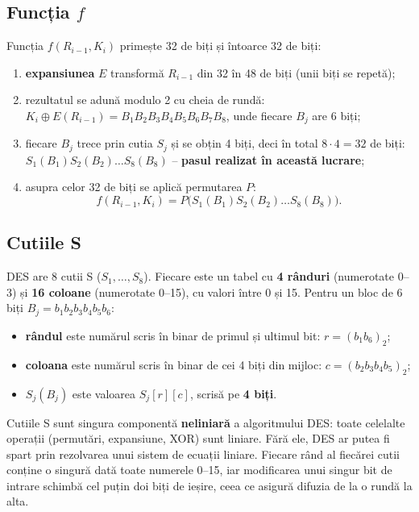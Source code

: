 \documentclass[12pt,a4paper]{article}
\begin{document}
\subsection{Funcția $f$}

Funcția $f(R_{i-1}, K_i)$ primește 32 de biți și întoarce 32 de biți:
\begin{enumerate}
    \item \textbf{expansiunea} $E$ transformă $R_{i-1}$ din 32 în 48 de biți (unii
    biți se repetă);
    \item rezultatul se adună modulo 2 cu cheia de rundă:
    $K_i \oplus E(R_{i-1}) = B_1B_2B_3B_4B_5B_6B_7B_8$, unde fiecare $B_j$ are
    6 biți;
    \item fiecare $B_j$ trece prin cutia $S_j$ și se obțin 4 biți, deci în total
    $8 \cdot 4 = 32$ de biți: $S_1(B_1)S_2(B_2)\dots S_8(B_8)$ -- \textbf{pasul
    realizat în această lucrare};
    \item asupra celor 32 de biți se aplică permutarea $P$:
    \[
        f(R_{i-1}, K_i) = P\bigl(S_1(B_1)S_2(B_2)\dots S_8(B_8)\bigr).
    \]
\end{enumerate}

\subsection{Cutiile S}

DES are 8 cutii S ($S_1, \dots, S_8$). Fiecare este un tabel cu \textbf{4 rânduri}
(numerotate 0--3) și \textbf{16 coloane} (numerotate 0--15), cu valori între 0 și
15. Pentru un bloc de 6 biți $B_j = b_1b_2b_3b_4b_5b_6$:
\begin{itemize}
    \item \textbf{rândul} este numărul scris în binar de primul și ultimul bit:
    $r = (b_1b_6)_2$;
    \item \textbf{coloana} este numărul scris în binar de cei 4 biți din mijloc:
    $c = (b_2b_3b_4b_5)_2$;
    \item $S_j(B_j)$ este valoarea $S_j[r][c]$, scrisă pe \textbf{4 biți}.
\end{itemize}

Cutiile S sunt singura componentă \textbf{neliniară} a algoritmului DES: toate
celelalte operații (permutări, expansiune, XOR) sunt liniare. Fără ele, DES ar
putea fi spart prin rezolvarea unui sistem de ecuații liniare. Fiecare rând al
fiecărei cutii conține o singură dată toate numerele 0--15, iar modificarea unui
singur bit de intrare schimbă cel puțin doi biți de ieșire, ceea ce asigură
difuzia de la o rundă la alta.
\end{document}
